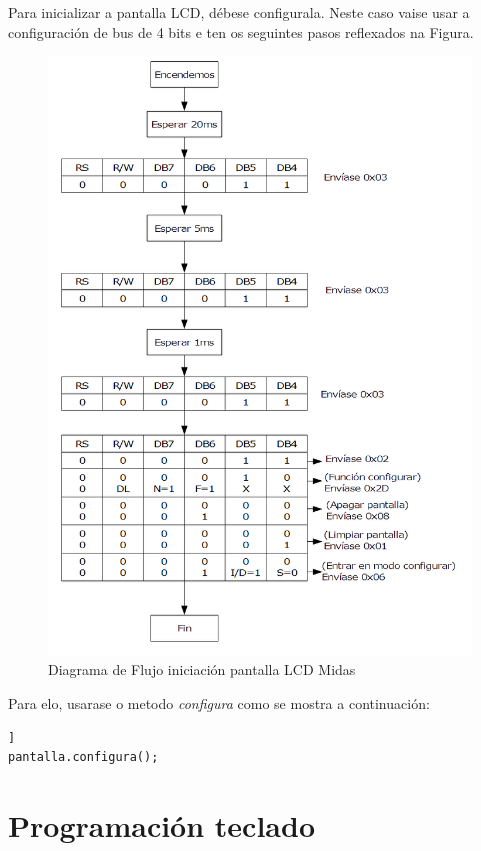 \documentclass[11pt,twoside]{book}
\begin{document}
Para inicializar a pantalla LCD, débese configurala. Neste caso vaise usar a configuración de bus de 4 bits e ten os seguintes pasos reflexados na Figura.

\begin{figure}[H]
	\begin{center}
		\includegraphics[scale=0.6]{images/inicializar_lcd.png}
	\end{center}
	\caption{Diagrama de Flujo iniciación pantalla LCD Midas}
	\label{fig:DiagramaFlujoPantalla}
\end{figure}

Para elo, usarase o metodo \textit{configura} como se mostra a continuación:
\begin{lstlisting}] 
pantalla.configura();
\end{lstlisting}

\section{Programación teclado}
\end{document}
